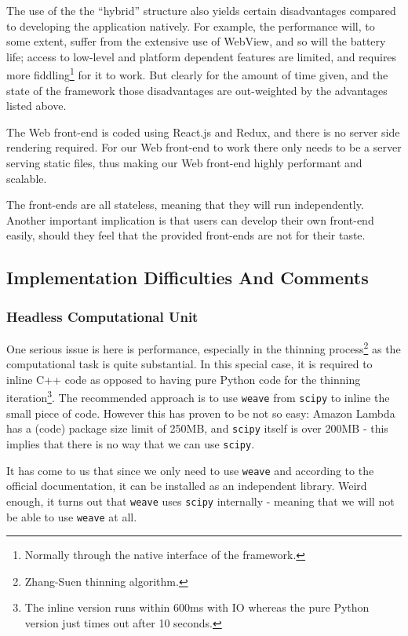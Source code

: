 The use of the the ``hybrid'' structure also yields certain disadvantages compared to developing the application natively. For example, the performance will, to some extent, suffer from the extensive use of WebView, and so will the battery life; access to low-level and platform dependent features are limited, and requires more fiddling\footnote{Normally through the native interface of the framework.} for it to work. But clearly for the amount of time given, and the state of the framework those disadvantages are out-weighted by the advantages listed above.

The Web front-end is coded using React.js and Redux, and there is no server side rendering required. For our Web front-end to work there only needs to be a server serving static files, thus making our Web front-end highly performant and scalable.

The front-ends are all stateless, meaning that they will run independently. Another important implication is that users can develop their own front-end easily, should they feel that the provided front-ends are not for their taste.

\subsection{Implementation Difficulties And Comments}


\subsubsection{Headless Computational Unit}

One serious issue is here is performance, especially in the thinning process\footnote{Zhang-Suen thinning algorithm.} as the computational task is quite substantial. In this special case, it is required to inline C++ code as opposed to having pure Python code for the thinning iteration\footnote{The inline version runs within 600ms with IO whereas the pure Python version just times out after 10 seconds.}. The recommended approach is to use \texttt{weave} from \texttt{scipy} to inline the small piece of code. However this has proven to be not so easy: Amazon Lambda has a (code) package size limit of 250MB, and \texttt{scipy} itself is over 200MB - this implies that there is no way that we can use \texttt{scipy}.

It has come to us that since we only need to use \texttt{weave} and according to the official documentation, it can be installed as an independent library. Weird enough, it turns out that \texttt{weave} uses \texttt{scipy} internally - meaning that we will not be able to use \texttt{weave} at all.

